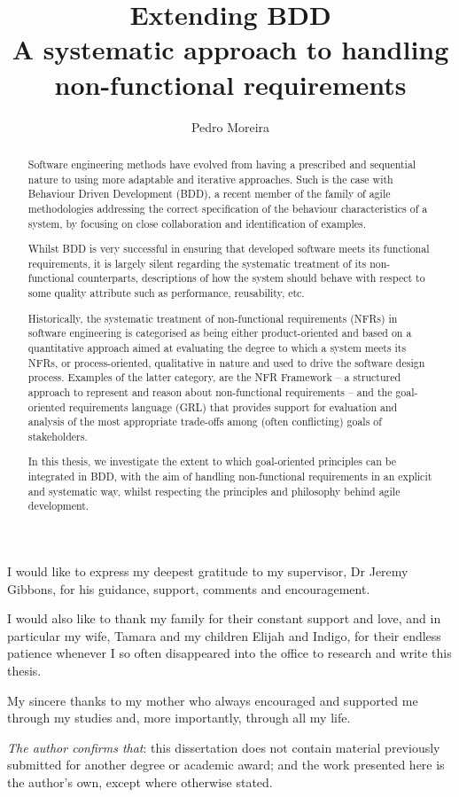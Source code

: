 \documentclass[dissertation,final]{softeng}
\title{Extending BDD\\A systematic approach to handling non-functional requirements}
\author{Pedro Moreira}
\begin{document}
\expandafter\def\csname PY@tok@err\endcsname{}
\maketitle


\begin{abstract}
Software engineering methods have evolved from having a prescribed and sequential nature to using more adaptable and iterative approaches. Such is the case with Behaviour Driven Development (BDD), a recent member of the family of agile methodologies addressing the correct specification of the behaviour characteristics of a system, by focusing on close collaboration and identification of examples.

Whilst BDD is very successful in ensuring that developed software meets its functional requirements, it is largely silent regarding the systematic treatment of its non-functional counterparts, descriptions of how the system should behave with respect to some quality attribute such as performance, reusability, etc.

Historically, the systematic treatment of non-functional requirements (NFRs) in software engineering is categorised as being either product-oriented and based on a quantitative approach aimed at evaluating the degree to which a system meets its NFRs, or process-oriented, qualitative in nature and used to drive the software design process. Examples of the latter category, are the NFR Framework -- a structured approach to represent and reason about non-functional requirements -- and the goal-oriented requirements language (GRL) that provides support for evaluation and analysis of the most appropriate trade-offs among (often conflicting) goals of stakeholders. 

In this thesis, we investigate the extent to which goal-oriented principles can be integrated in BDD, with the aim of handling non-functional requirements in an explicit and systematic way, whilst respecting the principles and philosophy behind agile development.
\end{abstract}

\clearpage

\begin{acknowledgements}
I would like to express my deepest gratitude to my supervisor, Dr Jeremy Gibbons, for his guidance, support, comments and encouragement.

I would also like to thank my family for their constant support and love, and in particular my wife, Tamara and my children Elijah and Indigo, for their endless patience whenever I so often disappeared into the office to research and write this thesis.

My sincere thanks to my mother who always encouraged and supported me through my studies and, more importantly, through all my life.

\emph{The author confirms that}: this dissertation does not contain material previously submitted for another degree or academic award; and the work presented here is the author's own, except where otherwise stated.
\end{acknowledgements}
\end{document}
